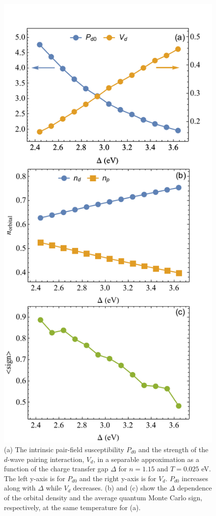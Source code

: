 \documentclass[reprint,nofootinbib,nobibnotes,amsmath,amssymb,aps,prb,floatfix]{revtex4-1}
\begin{document}
\begin{figure}[ht]
\includegraphics[width=0.92\columnwidth]{./Figures/2by2vsCTE.pdf}
\caption{(a) The intrinsic pair-field susceptibility $P_{d0}$ and the strength of the $d$-wave pairing interaction, $V_d$, in a separable approximation as a function of the charge transfer gap $\Delta$ for $n=1.15$ and $T=0.025$ eV. The left y-axis is for $P_{d0}$ and the right y-axis is for $V_d$. $P_{d0}$ increases along with $\Delta$ while $V_d$ decreases. (b) and (c) show the $\Delta$ dependence of the orbital density and the average quantum Monte Carlo sign, respectively, at the same temperature for (a).}
\label{Pd0Vd0}
\end{figure}
\end{document}
